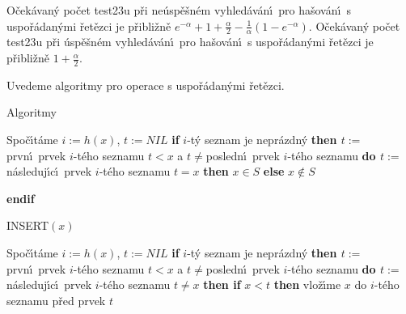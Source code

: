 \documentclass[a4paper,12pt]{article}
\begin{document}
O\v cek\'avan\'y po\v cet test\accent23u p\v ri 
ne\'usp\v e\v sn\'em vyhled\'av\'an\'\i\ pro ha\v sov\'an\'\i\ s uspo\v r\'a\-dan\'ymi 
\v ret\v ezci je p\v ribli\v zn\v e $e^{-\alpha}+1+\frac {\alpha}
2-\frac 1{\alpha}(1-e^{-\alpha})$. O\v cek\'avan\'y 
po\v cet test\accent23u p\v ri \'usp\v e\v sn\'em vyhled\'av\'an\'\i\ pro 
ha\v sov\'an\'\i\ s uspo\v r\'adan\'ymi \v ret\v ezci je 
p\v ribli\v zn\v e $1+\frac {\alpha}2.$
\endproclaim

\flushpar Uvedeme algoritmy pro operace s uspo\v r\'adan\'ymi 
\v re\-t\v ez\-ci.
\medskip

\subhead
Algoritmy
\endsubhead
\smallskip

\newline 
Spo\v c\'\i t\'ame $i:=h(x)$, $t:=NIL$\newline 
{\bf if} $i$-t\'y seznam je nepr\'azdn\'y {\bf then\newline 
\phantom{{\rm ---}}$t:=$}prvn\'\i\ prvek $i$-t\'eho seznamu\newline 
\phantom{---}{\bf while} $t<x$ a $t\ne$posledn\'\i\ prvek $i$-t\'eho seznamu {\bf do\newline 
\phantom{{\rm ------}}$t:=$}n\'asleduj\'\i c\'\i\ prvek $i$-t\'eho seznamu\newline 
\phantom{---}{\bf enddo\newline 
endif \newline 
if} $t=x$ {\bf then} $x\in S$ {\bf else} $x\notin S$ {\bf endif
\medskip

\flushpar INSERT$(x)$}\newline 
Spo\v c\'\i t\'ame $i:=h(x)$, $t:=NIL$\newline 
{\bf if} $i$-t\'y seznam je nepr\'azdn\'y {\bf then\newline 
\phantom{{\rm ---}}$t:=$}prvn\'\i\ prvek $i$-t\'eho seznamu\newline 
\phantom{---}{\bf while} $t<x$ a $t\ne$posledn\'\i\ prvek $i$-t\'eho seznamu {\bf do\newline 
\phantom{{\rm ------}}$t:=$}n\'asleduj\'\i c\'\i\ prvek $i$-t\'eho seznamu\newline 
\phantom{---}{\bf enddo\newline 
endif \newline 
if} $t\ne x$ {\bf then\newline 
\phantom{{\rm ---}}if} $x<t$ {\bf then\newline 
\phantom{{\rm ------}}}vlo\v z\'\i me $x$ do $i$-t\'eho seznamu p\v red prvek $
t$\newline 
\end{document}
